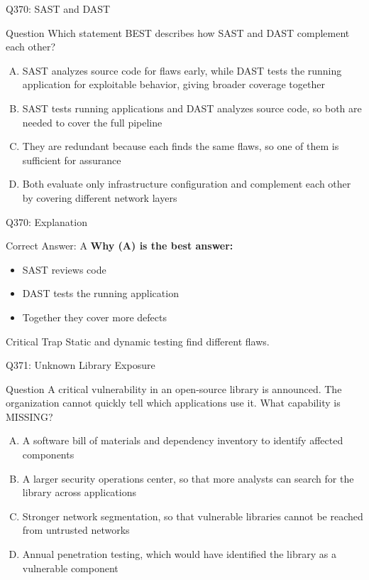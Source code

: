 \documentclass{beamer}
\begin{document}
	\begin{frame}{Q370: SAST and DAST}
		\begin{block}{Question}
			\small Which statement BEST describes how SAST and DAST complement each other?
		\end{block}
		\begin{enumerate}[(A)]
			\footnotesize
			\item SAST analyzes source code for flaws early, while DAST tests the running application for exploitable behavior, giving broader coverage together
			\item SAST tests running applications and DAST analyzes source code, so both are needed to cover the full pipeline
			\item They are redundant because each finds the same flaws, so one of them is sufficient for assurance
			\item Both evaluate only infrastructure configuration and complement each other by covering different network layers
		\end{enumerate}
	\end{frame}
	
	\begin{frame}{Q370: Explanation}
		\begin{block}{Correct Answer: A}
			\textbf{Why (A) is the best answer:}
			\begin{itemize}
				\item SAST reviews code
				\item DAST tests the running application
				\item Together they cover more defects
			\end{itemize}
		\end{block}
		\begin{alertblock}{Critical Trap}
			Static and dynamic testing find different flaws.
		\end{alertblock}
	\end{frame}
	
	\begin{frame}{Q371: Unknown Library Exposure}
		\begin{block}{Question}
			\small A critical vulnerability in an open-source library is announced. The organization cannot quickly tell which applications use it. What capability is MISSING?
		\end{block}
		\begin{enumerate}[(A)]
			\footnotesize
			\item A software bill of materials and dependency inventory to identify affected components
			\item A larger security operations center, so that more analysts can search for the library across applications
			\item Stronger network segmentation, so that vulnerable libraries cannot be reached from untrusted networks
			\item Annual penetration testing, which would have identified the library as a vulnerable component
		\end{enumerate}
	\end{frame}
	
\end{document}
